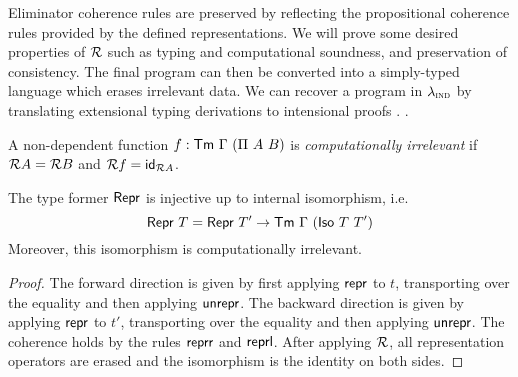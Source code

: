 Eliminator
coherence rules are preserved by reflecting the propositional coherence rules
provided by the defined representations. We will prove some desired properties
of $\mathcal{R}$ \cite{Boulier2017-cm} such as typing and computational soundness, and
preservation of consistency. The final program can then be converted into a
simply-typed language which erases irrelevant data. We can recover a program in
$\lambda_{\textsc{ind}}$ by translating extensional typing derivations to intensional proofs
\cite{Winterhalter2019-zw}.
\cite{Winterhalter2019-zw}.

\begin{definition}
    A non-dependent function $f : \mta{Tm}\ \Gamma\ (\Pi\ A\ B)$ is \emph{computationally irrelevant} if
    $\mathcal{R} A = \mathcal{R} B$ and $\mathcal{R} f = \textsf{id}_{\mathcal{R} A}$.
\end{definition}

\begin{lemma}
	The type former $\textsf{Repr}{}$ is injective up to internal isomorphism, i.e.
	\begin{equation}
	\mta{Repr}\ T = \mta{Repr}\ T' \to \Tm\ \Gamma\ (\mta{Iso}\ T\ T')
	\end{equation}
	Moreover, this isomorphism is computationally irrelevant.
	\begin{proof}
	The forward direction is given by first applying $\textsf{repr}$ to $t$,
	transporting over the equality and then applying $\textsf{unrepr}$. The
	backward direction is given by applying $\textsf{repr}$ to $t'$, transporting
	over the equality and then applying $\textsf{unrepr}$. The coherence holds by
	the rules $\textsf{reprr}$ and $\textsf{reprl}$. After applying $\mathcal{R}$, all
	representation operators are erased and the isomorphism is the identity on both
	sides.
	\end{proof}
\end{lemma}
